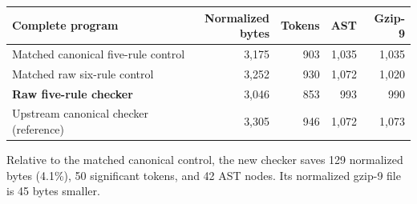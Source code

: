 \begin{center}
\small
\begin{tabular}{@{}lrrrr@{}}
\toprule
Complete program & \shortstack{Normalized\\bytes} & Tokens & AST & Gzip-9\\
\midrule
Matched canonical five-rule control & 3,175 & 903 & 1,035 & 1,035\\
Matched raw six-rule control & 3,252 & 930 & 1,072 & 1,020\\
\textbf{Raw five-rule checker} & 3,046 & 853 & 993 & 990\\
\midrule
Upstream canonical checker (reference) & 3,305 & 946 & 1,072 & 1,073\\
\bottomrule
\end{tabular}
\end{center}
Relative to the matched canonical control, the new checker saves 129 normalized bytes (4.1\%), 50 significant tokens, and 42 AST nodes. Its normalized gzip-9 file is 45 bytes smaller.
